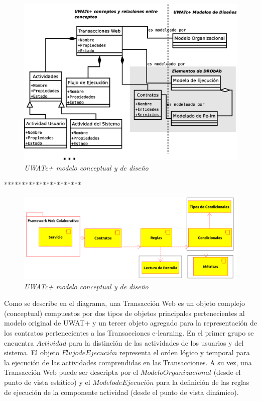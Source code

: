 	\begin{figure}[!h]
        \begin{center}
	\includegraphics[width=5 in,totalheight=3 in]{drobab.eps}
	\caption{\small \sl UWATc+ modelo conceptual y de diseño} \label{drobab}
         \end{center}
         \end{figure}

         
         **********************
         
         
	\begin{figure}[!h]
        \begin{center}
	\includegraphics[width=5 in,totalheight=3 in]{arqDHD.eps}
	\caption{\small \sl UWATc+ modelo conceptual y de diseño} \label{drobab}
         \end{center}
         \end{figure}
         

Como se describe en el diagrama, una Transacción Web es un objeto complejo
(conceptual) compuestos por dos tipos de objetos principales pertenecientes al
modelo original de UWAT+ y un tercer objeto  agregado para la representación de
los contratos pertenecientes a las Transacciones e-learning. En el primer grupo
se encuentra $Actividad$ para la distinción de las actividades de los usuarios y
del sistema. El objeto $Flujo de Ejecución$ representa el orden lógico y
temporal para la ejecución de las actividades comprendidas en las Transacciones.
A su vez, una Transacción Web puede ser descripta por el $Modelo Organizacional$
(desde el punto de vista estático) y el $Modelo de Ejecución$ para la definición
de las reglas de ejecución de la componente actividad (desde el punto de vista
dinámico). 

